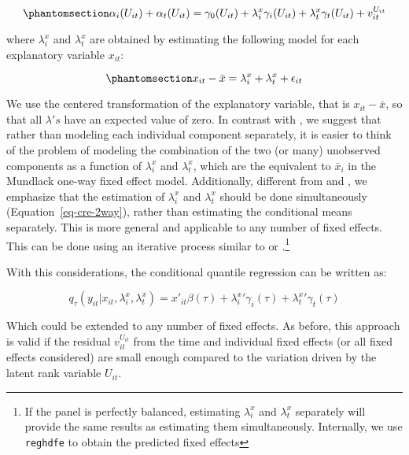 \documentclass[bib]{statapress}
\begin{document}
\begin{equation}\phantomsection\label{eq-cre-unobs}{\alpha_i(U_{it}) + \alpha_t(U_{it}) = \gamma_0(U_{it}) + \lambda_i^x \gamma_i(U_{it}) + \lambda_t^x \gamma_t(U_{it}) + v^{U_{it}}_{it}
}\end{equation}

where \(\lambda_i^x\) and \(\lambda_t^x\) are obtained by estimating the
following model for each explanatory variable \(x_{it}\):

\begin{equation}\phantomsection\label{eq-cre-2way}{x_{it} -\bar x = \lambda_i^x + \lambda_t^x + \epsilon_{it}
}\end{equation}

We use the centered transformation of the explanatory variable, that is
\(x_{it}-\bar x\), so that all \(\lambda's\) have an expected value of
zero. In contrast with \citet{baltagi2023}, we suggest that rather than
modeling each individual component separately, it is easier to think of
the problem of modeling the combination of the two (or many) unobserved
components as a function of \(\lambda_i^x\) and \(\lambda_t^x\), which
are the equivalent to \(\bar x_i\) in the Mundlack one-way fixed effect
model. Additionally, different from \citet{wooldridge2021} and
\citet{baltagi2023}, we emphasize that the estimation of \(\lambda_i^x\)
and \(\lambda_t^x\) should be done simultaneously
(Equation~\ref{eq-cre-2way}), rather than estimating the conditional
means separately. This is more general and applicable to any number of
fixed effects. This can be done using an iterative process similar to
\citet{rios2015} or \citet{correia_feasible_nodate}.\footnote{If the
  panel is perfectly balanced, estimating \(\lambda_i^x\) and
  \(\lambda_t^x\) separately will provide the same results as estimating
  them simultaneously. Internally, we use
  \citet{correia_feasible_nodate} \texttt{reghdfe} to obtain the
  predicted fixed effects}

With this considerations, the conditional quantile regression can be
written as:

\[q_\tau(y_{it}|x_{it},\lambda_i^x,\lambda_t^x)=x'_{it}\beta(\tau)+{\lambda^x_i}'\gamma_i(\tau)
+{\lambda^x_t}'\gamma_t(\tau)  
\]

Which could be extended to any number of fixed effects. As before, this
approach is valid if the residual \(v^{U_{it}}_{it}\) from the time and
individual fixed effects (or all fixed effects considered) are small
enough compared to the variation driven by the latent rank variable
\(U_{it}\).
\end{document}
